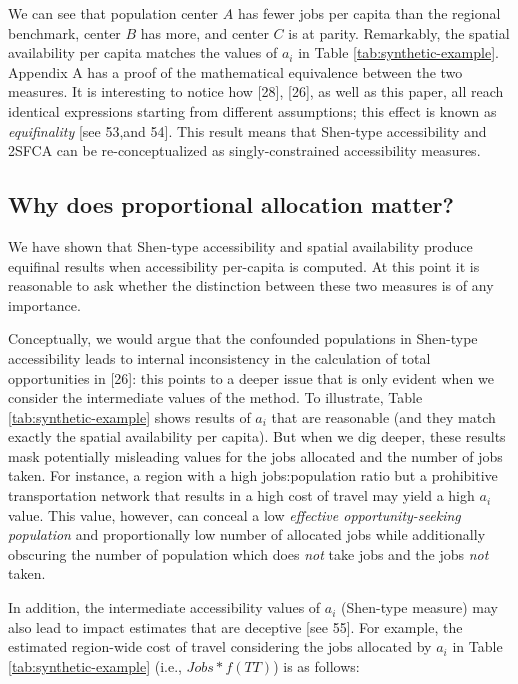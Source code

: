 \documentclass[10pt,letterpaper]{article}
\begin{document}
We can see that population center \(A\) has fewer jobs per capita than
the regional benchmark, center \(B\) has more, and center \(C\) is at
parity. Remarkably, the spatial availability per capita matches the
values of \(a_i\) in Table \ref{tab:synthetic-example}. Appendix A has a
proof of the mathematical equivalence between the two measures. It is
interesting to notice how {[}28{]}, {[}26{]}, as well as this paper, all
reach identical expressions starting from different assumptions; this
effect is known as \emph{equifinality} {[}see 53,and 54{]}. This result
means that Shen-type accessibility and 2SFCA can be re-conceptualized as
singly-constrained accessibility measures.

\hypertarget{why-does-proportional-allocation-matter}{%
\subsection{Why does proportional allocation
matter?}\label{why-does-proportional-allocation-matter}}

We have shown that Shen-type accessibility and spatial availability
produce equifinal results when accessibility per-capita is computed. At
this point it is reasonable to ask whether the distinction between these
two measures is of any importance.

Conceptually, we would argue that the confounded populations in
Shen-type accessibility leads to internal inconsistency in the
calculation of total opportunities in {[}26{]}: this points to a deeper
issue that is only evident when we consider the intermediate values of
the method. To illustrate, Table \ref{tab:synthetic-example} shows
results of \(a_i\) that are reasonable (and they match exactly the
spatial availability per capita). But when we dig deeper, these results
mask potentially misleading values for the jobs allocated and the number
of jobs taken. For instance, a region with a high jobs:population ratio
but a prohibitive transportation network that results in a high cost of
travel may yield a high \(a_i\) value. This value, however, can conceal
a low \emph{effective opportunity-seeking population} and proportionally
low number of allocated jobs while additionally obscuring the number of
population which does \emph{not} take jobs and the jobs \emph{not}
taken.

In addition, the intermediate accessibility values of \(a_i\) (Shen-type
measure) may also lead to impact estimates that are deceptive {[}see
55{]}. For example, the estimated region-wide cost of travel considering
the jobs allocated by \(a_i\) in Table \ref{tab:synthetic-example}
(i.e., \(Jobs*f(TT)\)) is as follows:
\end{document}
